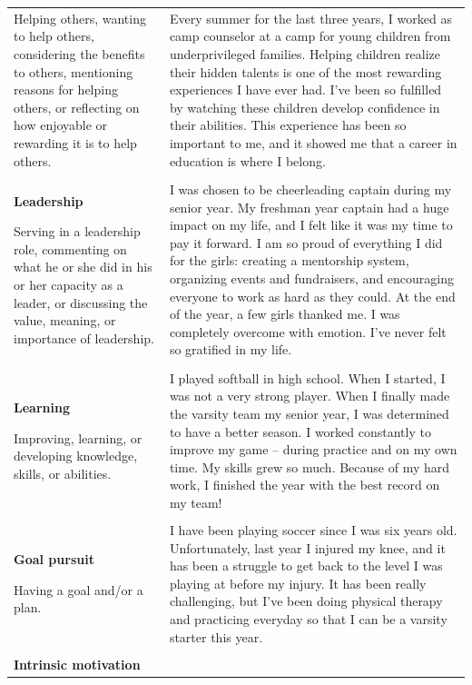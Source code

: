 \documentclass[11pt]{report}
\begin{document}
\begin{mainf}
\begin{table}[ht]
\begin{tabular}{  p{.275\linewidth}  p{.675\linewidth}}
Helping others, wanting to help others, considering the benefits to others, mentioning reasons for helping others, or reflecting on how enjoyable or rewarding it is to help others. & Every summer for the last three years, I worked as camp counselor at a camp for young children from underprivileged families. Helping children realize their hidden talents is one of the most rewarding experiences I have ever had. I’ve been so fulfilled by watching these children develop confidence in their abilities. This experience has been so important to me, and it showed me that a career in education is where I belong.                                         \\ \\
\textbf{Leadership}

Serving in a leadership role, commenting on what he or she did in his or her capacity as a leader, or discussing the value, meaning, or importance of leadership.                            & I was chosen to be cheerleading captain during my senior year. My freshman year captain had a huge impact on my life, and I felt like it was my time to pay it forward. I am so proud of everything I did for the girls: creating a mentorship system, organizing events and fundraisers, and encouraging everyone to work as hard as they could. At the end of the year, a few girls thanked me. I was completely overcome with emotion. I’ve never felt so gratified in my life. \\ \\
\textbf{Learning}

Improving, learning, or developing knowledge, skills, or abilities.                                                                                                                       & I played softball in high school. When I started, I was not a very strong player. When I finally made the varsity team my senior year, I was determined to have a better season. I worked constantly to improve my game – during practice and on my own time. My skills grew so much. Because of my hard work, I finished the year with the best record on my team!                                                                                                                \\ \\
\textbf{Goal pursuit}

Having a goal and/or a plan.                                                                                                                                                              & I have been playing soccer since I was six years old. Unfortunately, last year I injured my knee, and it has been a struggle to get back to the level I was playing at before my injury. It has been really challenging, but I’ve been doing physical therapy and practicing everyday so that I can be a varsity starter this year.                                                                                                                                                \\ \\
\textbf{Intrinsic motivation}


\end{tabular}
\end{table}
\end{mainf}
\end{document}
